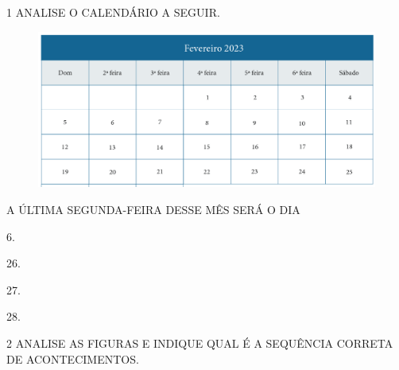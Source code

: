 \pagebreak
{}

\num{1} ANALISE O CALENDÁRIO A SEGUIR.

\begin{figure}[htpb!]
\centering
\includegraphics[width=\textwidth]{../ilustracoes/MAT1/SAEB_1ANO_MAT_FIGURA61.png}
\end{figure}

A ÚLTIMA SEGUNDA-FEIRA DESSE MÊS SERÁ O DIA

\begin{escolha}
\item 6.

\item 26.

\item 27.

\item 28.
\end{escolha}

\pagebreak

\num{2} ANALISE AS FIGURAS E INDIQUE QUAL É A SEQUÊNCIA CORRETA DE
ACONTECIMENTOS.




